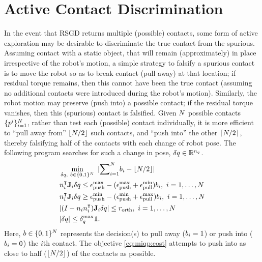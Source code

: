 \section{Active Contact Discrimination}
In the event that RSGD returns multiple (possible) contacts, some form of active exploration may be desirable to discriminate the true contact from the spurious.
Assuming contact with a static object, that will remain (approximately) in place irrespective of the robot's motion, a simple strategy to falsify a spurious contact is to move the robot so as to break contact (pull away) at that location; if residual torque remains, then this cannot have been the true contact (assuming no additional contacts were introduced during the robot's motion). 
Similarly, the robot motion may preserve (push into) a possible contact; if the residual torque vanishes, then this (spurious) contact is falsified. 
Given $N$ possible contacts 
$\lbrace p^{i}\rbrace_{i=1}^N$, 
rather than test each (possible) contact individually, it is more efficient to ``pull away from'' $\lfloor{N/2}\rfloor$ such contacts, and ``push into'' the other $\lceil{N/2}\rceil$, thereby falsifying half of the contacts with each change of robot pose. 
The following program searches for such a change in pose, ${\delta q}\in\mathbb{R}^{n_q}$.
\begin{subequations}
\label{eq:miqp}
\begin{align}
& \min_{{\delta q}, \ b\in\{0, 1\}^N} \ |{\sum}_{i=1}^N b_i - \lfloor{N/2}\rfloor | \label{eq:miqp:cost} \\
& n_i^\intercal\mathbf{J}_i{\delta q} \leq \epsilon_\text{push}^\text{max} - (\epsilon_\text{push}^\text{max} + \epsilon_\text{pull}^\text{min})b_i, \ i = 1,\dots,N \label{eq:miqp:pull} \\
& n_i^\intercal\mathbf{J}_i{\delta q} \geq \epsilon_\text{push}^\text{min} - (\epsilon_\text{push}^\text{min} + \epsilon_\text{pull}^\text{max})b_i, \ i = 1,\dots,N  \label{eq:miqp:push} \\
& | (I - n_in_i^\intercal)\mathbf{J}_i{\delta q} | \leq {r_\text{orth}}, \ i = 1,\dots,N \label{eq:miqp:orth} \\
& |{\delta q}| \leq \delta_{q}^\text{max}\mathbf{1}. \label{eq:miqp:lim}
\end{align}
\end{subequations}
Here, $b\in\{0, 1\}^N$ represents the decision(s) to pull away ($b_i=1$) or push into ($b_i=0$) the $i$th contact.
The objective \eqref{eq:miqp:cost} attempts to push into as close to half ($\lfloor{N/2}\rfloor$) of the contacts as possible.
